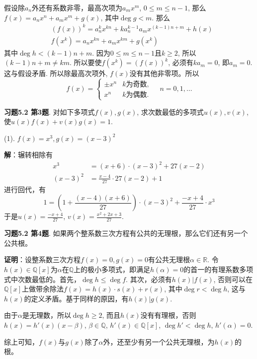 假设除$a_n$外还有系数非零，最高次项为$a_mx^m$, $0 \leqslant m \leqslant n-1$, 那么$f(x) = a_nx^n + a_mx^m + g(x)$, 其中$\deg g < m$. 那么
\begin{align*}
& (f(x))^k = a_n^kx^{kn} + ka_n^{k-1}a_mx^{(k-1)n+m} + h(x) \\
& f(x^k) = a_nx^{kn} + a_mx^{km} + g(x^k)
\end{align*}
其中$\deg h < (k-1)n+m$. 因为$0 \leqslant m \leqslant n-1$且$k\geqslant 2$, 所以$(k-1)n+m \neq km$. 所以要使$f(x^k) = (f(x))^k$, 必须有$ka_m = 0$, 即$a_m = 0$. 这与假设矛盾. 所以除最高次项外, $f(x)$没有其他非零项。所以
$$f(x) = \begin{cases}\pm x^n & \text{$k$为奇数}, \\ x^n & \text{$k$为偶数}. \end{cases} \quad n = 0, 1, \ldots$$

\newpageorvspace


{\bf 习题5.2 第3题}. 对如下多项式$f(x), g(x)$, 求次数最低的多项式$u(x), v(x)$, 使$u(x)f(x) + v(x)g(x) = 1$.

(1). $f(x) = x^3, g(x) = (x-3)^2$

{\bf 解}：辗转相除有
\begin{align*}
x^3 & = (x+6) \cdot (x-3)^2 + 27(x-2) \\
(x-3)^2 & = \frac{x-4}{27} \cdot 27(x-2) + 1
\end{align*}
进行回代，有
$$1 = \left( 1 + \frac{(x-4)(x+6)}{27} \right) \cdot (x-3)^2 + \frac{-x+4}{27} \cdot x^3$$
于是$u(x) = \frac{-x+4}{27}$, $v(x) = \frac{x^2+2x+3}{27}$.

\newpageorvspace


{\bf 习题5.2 第4题}. 如果两个整系数三次方程有公共的无理根，那么它们还有另一个公共根。

{\bf 证明}：设整系数三次方程$f(x) = 0, g(x) = 0$有公共无理根$\alpha\in\mathbb{R}$. 令$h(x)\in\mathbb{Q}[x]$为$\alpha$在$\mathbb{Q}$上的极小多项式，即满足$h(\alpha) = 0$的首一的有理系数多项式中次数最低的。首先，$\deg h \leqslant \deg f$. 其次，必须有$h(x)|f(x)$, 否则可以在$\mathbb{Q}[x]$上做带余除法$f(x) = h(x)\cdot s(x) + r(x)$, 其中$\deg r < \deg h$, 这与$h(x)$的定义矛盾。基于同样的原因，有$h(x)|g(x)$.

由于$\alpha$是无理数，所以$\deg h \geqslant 2$, 而且$h(x)$没有有理根，否则$h(x) = h'(x)(x-\beta)$, $\beta\in\mathbb{Q}$, $h'(x)\in\mathbb{Q}[x]$, $\deg h' < \deg h$, $h'(\alpha) = 0$.

综上可知，$f(x)$与$g(x)$除了$\alpha$外，还至少有另一个公共无理根，为$h(x)$的根。

